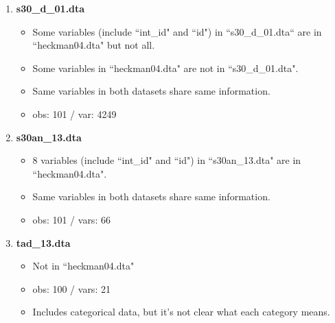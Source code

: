\documentclass[11pt]{article}
\begin{document}
\begin{enumerate}
\begin{itemize}
    \end{itemize}
    \item {\bf s30\_d\_01.dta}
    \begin{itemize}
        \item Some variables (include ``int\_id" and ``id") in ``s30\_d\_01.dta`` are in ``heckman04.dta" but not all.
        \item Some variables in ``heckman04.dta" are not in ``s30\_d\_01.dta".
        \item Same variables in both datasets share same information.
        \item obs: 101 / var: 4249\\
    \end{itemize}
    \item {\bf s30an\_13.dta}
    \begin{itemize}
        \item 8 variables (include ``int\_id" and ``id") in ``s30an\_13.dta" are in ``heckman04.dta".
        \item Same variables in both datasets share same information.
        \item obs: 101 / vars: 66\\
    \end{itemize}
    \item {\bf tad\_13.dta}
    \begin{itemize}
        \item Not in ``heckman04.dta"
        \item obs: 100 / vars: 21
        \item Includes categorical data, but it's not clear what each category means.
    \end{itemize}
\end{enumerate}
\end{document}
